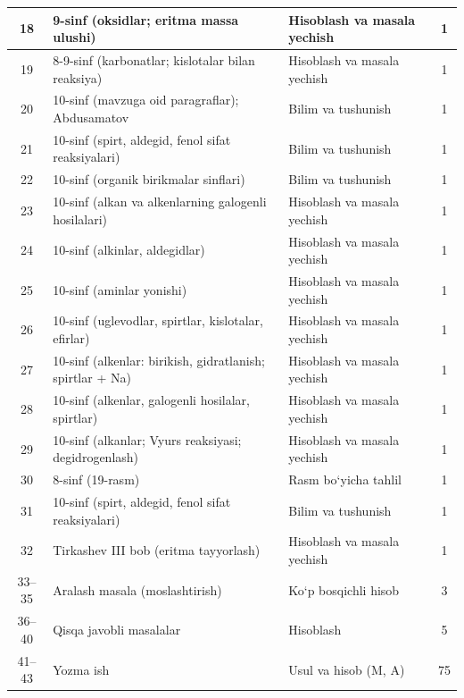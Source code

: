 \documentclass[11pt,a4paper]{article}
\begin{document}
{\begin{longtable}{|c|p{7.2cm}|p{5.4cm}|c|}
18 & 9-sinf (oksidlar; eritma massa ulushi) & Hisoblash va masala yechish & 1\\\hline
19 & 8-9-sinf (karbonatlar; kislotalar bilan reaksiya) & Hisoblash va masala yechish & 1\\\hline
20 & 10-sinf (mavzuga oid paragraflar); Abdusamatov & Bilim va tushunish & 1\\\hline
21 & 10-sinf (spirt, aldegid, fenol sifat reaksiyalari) & Bilim va tushunish & 1\\\hline
22 & 10-sinf (organik birikmalar sinflari) & Bilim va tushunish & 1\\\hline
23 & 10-sinf (alkan va alkenlarning galogenli hosilalari) & Hisoblash va masala yechish & 1\\\hline
24 & 10-sinf (alkinlar, aldegidlar) & Hisoblash va masala yechish & 1\\\hline
25 & 10-sinf (aminlar yonishi) & Hisoblash va masala yechish & 1\\\hline
26 & 10-sinf (uglevodlar, spirtlar, kislotalar, efirlar) & Hisoblash va masala yechish & 1\\\hline
27 & 10-sinf (alkenlar: birikish, gidratlanish; spirtlar + Na) & Hisoblash va masala yechish & 1\\\hline
28 & 10-sinf (alkenlar, galogenli hosilalar, spirtlar) & Hisoblash va masala yechish & 1\\\hline
29 & 10-sinf (alkanlar; Vyurs reaksiyasi; degidrogenlash) & Hisoblash va masala yechish & 1\\\hline
30 & 8-sinf (19-rasm) & Rasm bo`yicha tahlil & 1\\\hline
31 & 10-sinf (spirt, aldegid, fenol sifat reaksiyalari) & Bilim va tushunish & 1\\\hline
32 & Tirkashev III bob (eritma tayyorlash) & Hisoblash va masala yechish & 1\\\hline
33--35 & Aralash masala (moslashtirish) & Ko`p bosqichli hisob & 3\\\hline
36--40 & Qisqa javobli masalalar & Hisoblash & 5\\\hline
41--43 & Yozma ish & Usul va hisob (M, A) & 75\\\hline
\end{longtable}}
\end{document}

